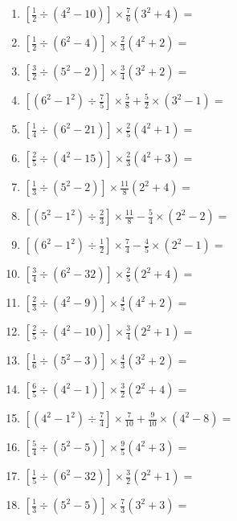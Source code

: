 \documentclass[12pt]{article}
\begin{document}
\begin{enumerate}[ itemsep=1.5cm]
	\item $\displaystyle \left[ \frac{1}{2} \div \left( 4^2 - 10 \right) \right] \times \frac{7}{6} \left( 3^2 + 4 \right) =$
	\item $\displaystyle \left[ \frac{1}{2} \div \left( 6^2 - 4 \right) \right] \times \frac{2}{3} \left( 4^2 + 2 \right) =$
	\item $\displaystyle \left[ \frac{3}{2} \div \left( 5^2 - 2 \right) \right] \times \frac{3}{4} \left( 3^2 + 2 \right) =$
	\item $\displaystyle \left[ \left( 6^2 - 1^2 \right) \div \frac{7}{5} \right] \times \frac{5}{8} + \frac{5}{2} \times \left( 3^2 - 1 \right) =$
	\item $\displaystyle \left[ \frac{1}{4} \div \left( 6^2 - 21 \right) \right] \times \frac{2}{5} \left( 4^2 + 1 \right) =$
	\item $\displaystyle \left[ \frac{2}{5} \div \left( 4^2 - 15 \right) \right] \times \frac{2}{3} \left( 4^2 + 3 \right) =$
	\item $\displaystyle \left[ \frac{1}{3} \div \left( 5^2 - 2 \right) \right] \times \frac{11}{8} \left( 2^2 + 4 \right) =$
	\item $\displaystyle \left[ \left( 5^2 - 1^2 \right) \div \frac{2}{3} \right] \times \frac{11}{8} - \frac{5}{4} \times \left( 2^2 - 2 \right) =$
	\item $\displaystyle \left[ \left( 6^2 - 1^2 \right) \div \frac{1}{2} \right] \times \frac{7}{4} - \frac{4}{5} \times \left( 2^2 - 1 \right) =$

	\item $\displaystyle \left[ \frac{3}{4} \div \left( 6^2 - 32 \right) \right] \times \frac{2}{5} \left( 2^2 + 4 \right) =$
	\item $\displaystyle \left[ \frac{2}{3} \div \left( 4^2 - 9 \right) \right] \times \frac{4}{5} \left( 4^2 + 2 \right) =$
	\item $\displaystyle \left[ \frac{2}{5} \div \left( 4^2 - 10 \right) \right] \times \frac{3}{4} \left( 2^2 + 1 \right) =$
	\item $\displaystyle \left[ \frac{1}{6} \div \left( 5^2 - 3 \right) \right] \times \frac{4}{3} \left( 3^2 + 2 \right) =$
	\item $\displaystyle \left[ \frac{6}{5} \div \left( 4^2 - 1 \right) \right] \times \frac{3}{2} \left( 2^2 + 4 \right) =$
	\item $\displaystyle \left[ \left( 4^2 - 1^2 \right) \div \frac{7}{4} \right] \times \frac{7}{10} + \frac{9}{10} \times \left( 4^2 - 8 \right) =$
	\item $\displaystyle \left[ \frac{5}{4} \div \left( 5^2 - 5 \right) \right] \times \frac{9}{5} \left( 4^2 + 3 \right) =$
	\item $\displaystyle \left[ \frac{1}{5} \div \left( 6^2 - 32 \right) \right] \times \frac{3}{2} \left( 2^2 + 1 \right) =$
	\item $\displaystyle \left[ \frac{1}{3} \div \left( 5^2 - 5 \right) \right] \times \frac{7}{3} \left( 3^2 + 3 \right) =$


\end{enumerate}
\end{document}
